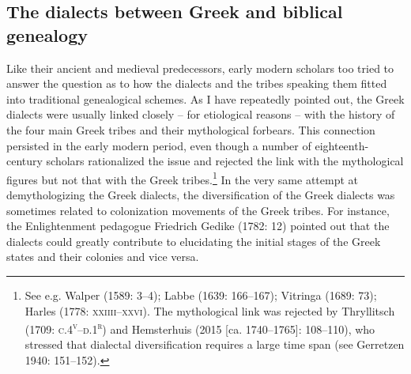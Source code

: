 \subsection{The dialects between Greek and biblical genealogy}
\hypertarget{Toc19704837}{}\begin{styleStandard}
Like their ancient and medieval predecessors, early modern scholars too tried to answer the question as to how the dialects and the tribes speaking them fitted into traditional genealogical schemes. As I have repeatedly pointed out, the Greek dialects were usually linked closely – for etiological reasons – with the history of the four main Greek tribes and their mythological forbears. This connection persisted in the early modern period, even though a number of eighteenth-century scholars rationalized the issue and rejected the link with the mythological figures but not that with the Greek tribes.\footnote{ See e.g. Walper (1589: 3–4); Labbe (1639: 166–167); Vitringa (1689: 73); Harles (1778: \textsc{xxiiii–xxvi}). The mythological link was rejected by Thryllitsch (1709: \textsc{c.4}\textsc{\textsuperscript{v}}\textsc{–d.1}\textsc{\textsuperscript{r}}) and Hemsterhuis (2015 [ca. 1740–1765]: 108–110), who stressed that dialectal diversification requires a large time span (see Gerretzen 1940: 151–152).} In the very same attempt at demythologizing the Greek dialects, the diversification of the Greek dialects was sometimes related to colonization movements of the Greek tribes. For instance, the Enlightenment pedagogue Friedrich Gedike (1782: 12) pointed out that the dialects could greatly contribute to elucidating the initial stages of the Greek states and their colonies and vice versa.
\end{styleStandard}


